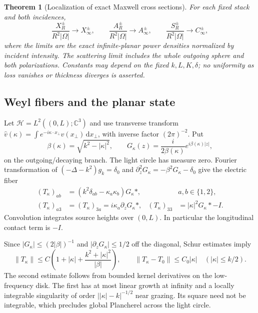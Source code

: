 \documentclass[11pt,a4paper]{article}
\newtheorem{theorem}{Theorem}[section]
\theoremstyle{remark}
\newcommand{\norm}[1]{\lVert #1\rVert}
\newcommand{\abs}[1]{\lvert #1\rvert}
\newcommand{\dd}{\,\mathrm d}
\begin{document}
\begin{theorem}[Localization of exact Maxwell cross sections]\label{thm:localization}
For each fixed stack and both incidences,
\begin{equation}\label{eq:localization}
 \frac{X_R^\pm}{R^2\abs\Omega}\longrightarrow X_\infty^\pm,\qquad
 \frac{A_R^\pm}{R^2\abs\Omega}\longrightarrow A_\infty^\pm,\qquad
 \frac{S_R^\pm}{R^2\abs\Omega}\longrightarrow C_\infty^\pm,
\end{equation}
where the limits are the exact infinite-planar power densities normalized by incident intensity. The scattering limit includes the whole outgoing sphere and both polarizations. Constants may depend on the fixed $k,L,K,\delta$; no uniformity as loss vanishes or thickness diverges is asserted.
\end{theorem}

\subsection{Weyl fibers and the planar state}
Let $\mathcal H=L^2((0,L);\mathbb C^3)$ and use transverse transform $\widehat v(\kappa)=\int e^{-i\kappa\cdot x_\perp}v(x_\perp)\dd x_\perp$, with inverse factor $(2\pi)^{-2}$. Put
\[
 \beta(\kappa)=\sqrt{k^2-\abs\kappa^2},\qquad
 G_\kappa(z)=\frac{i}{2\beta(\kappa)}e^{i\beta(\kappa)\abs z},
\]
on the outgoing/decaying branch. The light circle has measure zero. Fourier transformation of $(-\Delta-k^2)g_k=\delta_0$ and $\partial_z^2G_\kappa=-\beta^2G_\kappa-\delta_0$ give the electric fiber
\begin{equation}\label{eq:fibers}
 \begin{aligned}
 (T_\kappa)_{ab}&=(k^2\delta_{ab}-\kappa_a\kappa_b)G_\kappa*,&&a,b\in\{1,2\},\\
 (T_\kappa)_{a3}&=(T_\kappa)_{3a}=i\kappa_a\partial_zG_\kappa*,&
 (T_\kappa)_{33}&=\abs\kappa^2G_\kappa*-I.
 \end{aligned}
\end{equation}
Convolution integrates source heights over $(0,L)$. In particular the longitudinal contact term is $-I$.

Since $\abs{G_\kappa}\leq(2\abs\beta)^{-1}$ and $\abs{\partial_zG_\kappa}\leq1/2$ off the diagonal, Schur estimates imply
\begin{equation}\label{eq:fiber-bounds}
 \norm{T_\kappa}\leq C\left(1+\abs\kappa+\frac{k^2+\abs\kappa^2}{\abs\beta}\right),\qquad
 \norm{T_\kappa-T_0}\leq C_0\abs\kappa\quad(\abs\kappa\leq k/2).
\end{equation}
The second estimate follows from bounded kernel derivatives on the low-frequency disk. The first has at most linear growth at infinity and a locally integrable singularity of order $\abs{\abs\kappa-k}^{-1/2}$ near grazing. Its square need not be integrable, which precludes global Plancherel across the light circle.
\end{document}
